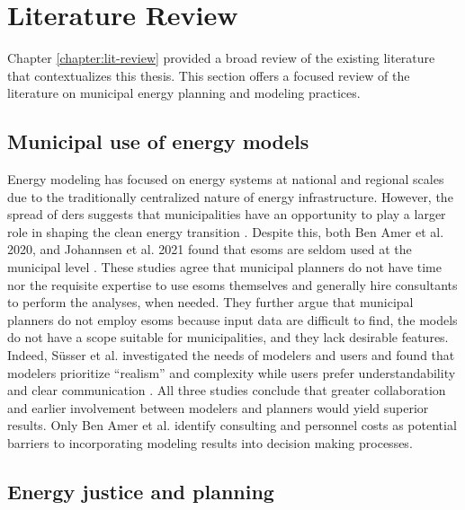 \section{Literature Review}
Chapter \ref{chapter:lit-review} provided a broad review of the existing
literature that contextualizes this thesis. This section offers a focused review
of the literature on municipal energy planning and modeling practices.

\subsection{Municipal use of energy models}

Energy modeling has focused on energy systems at national and regional scales
due to the traditionally centralized nature of energy infrastructure. However,
the spread of \acp{der} suggests that municipalities have an opportunity to play
a larger role in shaping the clean energy transition
\cite{shen_facilitating_2021}. Despite this, both Ben Amer et al. 2020, and
Johannsen et al. 2021 found that \acp{esom} are seldom used at the municipal
level \cite{ben_amer_too_2020,johannsen_designing_2021}. These studies agree
that municipal planners do not have time nor the requisite expertise to use
\acp{esom} themselves and generally hire consultants to perform the analyses,
when needed. They further argue that municipal planners do not employ \acp{esom}
because input data are difficult to find, the models do not have a scope
suitable for municipalities, and they lack desirable features. Indeed,
S\"{u}sser et al. investigated the needs of modelers and users and found that
modelers prioritize ``realism'' and complexity while users prefer
understandability and clear communication \cite{susser_better_2022}. All three
studies conclude that greater collaboration and earlier involvement between
modelers and planners would yield superior results. Only Ben Amer et al.
identify consulting and personnel costs as potential barriers to incorporating
modeling results into decision making processes.


\subsection{Energy justice and planning}


